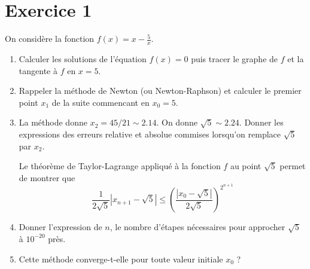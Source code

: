 \documentclass[10pt]{article}
\begin{document}
\section*{Exercice 1}
On considère la fonction $f(x)=x-\frac{5}{x}$.
\begin{enumerate}
    \item Calculer les solutions de l'équation $f(x)=0$ puis tracer le graphe de $f$ et la tangente à $f$ en $x=5$.
    \item Rappeler la méthode de Newton (ou Newton-Raphson) et calculer le premier point $x_1$ de la suite commencant en $x_0=5$.
    \item La méthode donne $x_2 = 45/21 \mathop{\sim} 2.14$. On donne $\sqrt{5} \mathop{\sim} 2.24$. \newline 
    Donner les expressions des erreurs relative et absolue commises lorsqu'on remplace $\sqrt{5}$ par $x_2$.

    \vspace{1em}

\noindent Le théorème de Taylor-Lagrange appliqué à la fonction $f$ au point $\sqrt{5}$ permet de montrer que 
$$
\frac{1}{2\sqrt{5}}\left|x_{n+1}-\sqrt{5}\right| \leq\left(\frac{|x_0-\sqrt{5}|}{2\sqrt{5}}\right)^{2^{n+1}}
$$

    \item Donner l'expression de $n$, le nombre d'étapes nécessaires pour approcher $\sqrt{5}$ à $10^{-20}$ près.
    \item Cette méthode converge-t-elle pour toute valeur initiale $x_0$ ?
\end{enumerate}

\vspace{1em}
\end{document}
